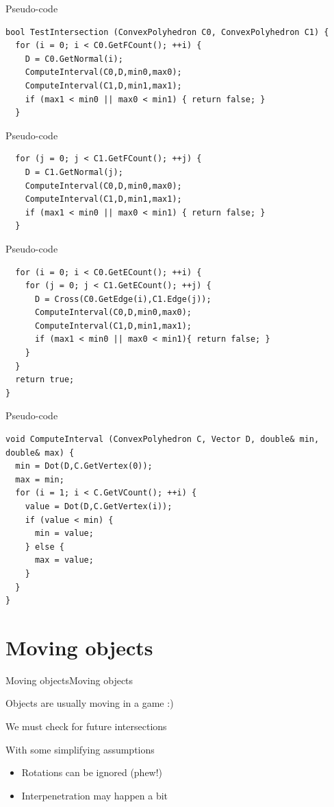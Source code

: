 \documentclass{beamer}
\begin{document}
\begin{frame}[fragile]{Pseudo-code}
\begin{lstlisting}
bool TestIntersection (ConvexPolyhedron C0, ConvexPolyhedron C1) { 
  for (i = 0; i < C0.GetFCount(); ++i) { 
    D = C0.GetNormal(i); 
    ComputeInterval(C0,D,min0,max0);    
    ComputeInterval(C1,D,min1,max1); 
    if (max1 < min0 || max0 < min1) { return false; }
  }
\end{lstlisting}
\end{frame}
\begin{frame}[fragile]{Pseudo-code}
\begin{lstlisting}  
  for (j = 0; j < C1.GetFCount(); ++j) { 
    D = C1.GetNormal(j); 
    ComputeInterval(C0,D,min0,max0); 
    ComputeInterval(C1,D,min1,max1); 
    if (max1 < min0 || max0 < min1) { return false; } 
  }
\end{lstlisting}
\end{frame}
\begin{frame}[fragile]{Pseudo-code}
\begin{lstlisting}
  for (i = 0; i < C0.GetECount(); ++i) { 
    for (j = 0; j < C1.GetECount(); ++j) { 
      D = Cross(C0.GetEdge(i),C1.Edge(j)); 
      ComputeInterval(C0,D,min0,max0); 
      ComputeInterval(C1,D,min1,max1); 
      if (max1 < min0 || max0 < min1){ return false; }
    } 
  }
  return true;
}
\end{lstlisting}
\end{frame}
\begin{frame}[fragile]{Pseudo-code}
\begin{lstlisting}
void ComputeInterval (ConvexPolyhedron C, Vector D, double& min, double& max) { 
  min = Dot(D,C.GetVertex(0)); 
  max = min; 
  for (i = 1; i < C.GetVCount(); ++i) { 
    value = Dot(D,C.GetVertex(i)); 
    if (value < min) {
      min = value;
    } else { 
      max = value; 
    }
  }
}
\end{lstlisting}
\end{frame}

\section{Moving objects}
\begin{slide}{Moving objects}{Moving objects}{
\item Objects are usually moving in a game :)
\item We must check for future intersections
\item With some simplifying assumptions 
\begin{itemize}
\item Rotations can be ignored (phew!)
\item Interpenetration may happen a bit
\end{itemize}
}\end{slide}
\end{document}
